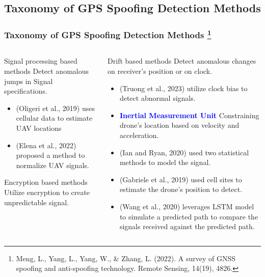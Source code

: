 \documentclass[aspectratio=169, 8pt]{beamer}
\begin{document}
\subsection{Taxonomy of GPS Spoofing Detection Methods}
\begin{frame}
\frametitle{Taxonomy of GPS Spoofing Detection Methods \footnote{Meng, L., Yang, L., Yang, W., \& Zhang, L. (2022). A survey of GNSS spoofing and anti-spoofing technology. Remote Sensing, 14(19), 4826.}}

\begin{columns}
    \begin{column}{0.5\textwidth}
        \begin{block}{ Signal processing based methods}
            Detect anomalous jumps in Signal specifications.
        \end{block}

        {\small
        \begin{itemize}
            \item  (Oligeri et al., 2019) uses cellular data to estimate UAV locations
            \item (Elena et al., 2022) proposed a method to normalize UAV signals.
        \end{itemize}
        }

    
        
    \begin{block}{ Encryption based methods}
            Utilize encryption to create unpredictable signal.
        \end{block}

        


    \end{column}
        
    \begin{column}{0.5\textwidth}
       \begin{block}{ Drift based methods}
            Detect anomalous changes on receiver's position or on clock.
        \end{block}

        {\small
        \begin{itemize}
            \item (Truong et al., 2023) utilize clock bias to detect abnormal signals.
            \item  \textbf{\textcolor{blue}{Inertial Measurement Unit} } Constraining drone's location based on velocity and acceleration.
            \item (Ian and Ryan, 2020) used two statistical methods to model the signal.
            \item (Gabriele et al., 2019) used cell sites to estimate the drone's position to detect.
            \item (Wang et al., 2020) leverages LSTM model to simulate a predicted path to compare the signals received against the predicted path. 
        \end{itemize} 
        }
        

\end{column}
\end{columns}
\end{frame}
\end{document}
